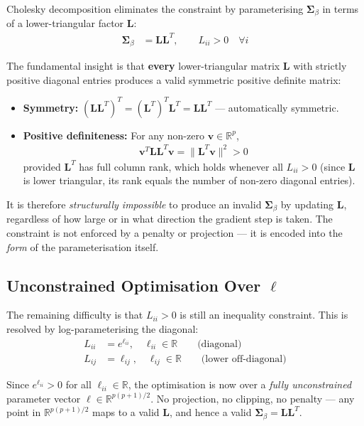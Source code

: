 \documentclass[11pt,a4paper]{article}
\newcommand{\R}{\mathbb{R}}
\begin{document}
Cholesky decomposition eliminates the constraint by parameterising $\bm{\Sigma}_\beta$ in terms of a lower-triangular factor $\bm{L}$:
\begin{align}
  \bm{\Sigma}_\beta &= \bm{L}\bm{L}^T, \qquad L_{ii} > 0 \quad \forall i
\end{align}

The fundamental insight is that \textbf{every} lower-triangular matrix $\bm{L}$ with strictly positive diagonal entries produces a valid symmetric positive definite matrix:

\begin{itemize}
  \item \textbf{Symmetry:} $(\bm{L}\bm{L}^T)^T = (\bm{L}^T)^T\bm{L}^T = \bm{L}\bm{L}^T$ \quad --- automatically symmetric.
  \item \textbf{Positive definiteness:} For any non-zero $\bm{v} \in \R^p$,
  \begin{align}
    \bm{v}^T \bm{L}\bm{L}^T \bm{v} = \|\bm{L}^T\bm{v}\|^2 > 0
  \end{align}
  provided $\bm{L}^T$ has full column rank, which holds whenever all $L_{ii} > 0$ (since $\bm{L}$ is lower triangular, its rank equals the number of non-zero diagonal entries).
\end{itemize}

It is therefore \emph{structurally impossible} to produce an invalid $\bm{\Sigma}_\beta$ by updating $\bm{L}$, regardless of how large or in what direction the gradient step is taken. The constraint is not enforced by a penalty or projection --- it is encoded into the \emph{form} of the parameterisation itself.

\subsection*{Unconstrained Optimisation Over $\bm{\ell}$}

The remaining difficulty is that $L_{ii} > 0$ is still an inequality constraint. This is resolved by log-parameterising the diagonal:
\begin{align}
  L_{ii} &= e^{\ell_{ii}}, \quad \ell_{ii} \in \R \qquad \text{(diagonal)}\\
  L_{ij} &= \ell_{ij}, \quad \ell_{ij} \in \R \qquad \text{(lower off-diagonal)}
\end{align}

Since $e^{\ell_{ii}} > 0$ for all $\ell_{ii} \in \R$, the optimisation is now over a \emph{fully unconstrained} parameter vector $\bm{\ell} \in \R^{p(p+1)/2}$. No projection, no clipping, no penalty --- any point in $\R^{p(p+1)/2}$ maps to a valid $\bm{L}$, and hence a valid $\bm{\Sigma}_\beta = \bm{L}\bm{L}^T$.
\end{document}
